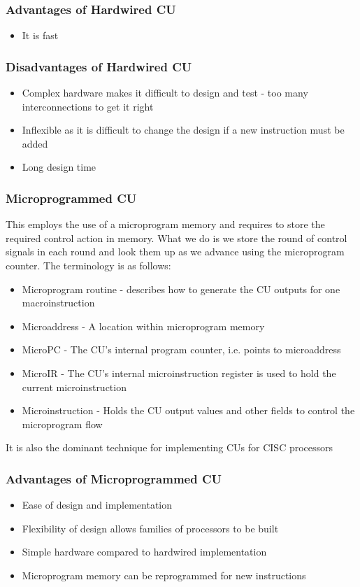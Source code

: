 \documentclass[a4paper]{article}
\theoremstyle{plain}
\theoremstyle{definition}
\theoremstyle{remark}
\begin{document}
\subsubsection{Advantages of Hardwired CU}
\begin{itemize}
	\item It is fast
\end{itemize}
\subsubsection{Disadvantages of Hardwired CU}
\begin{itemize}
	\item Complex hardware makes it difficult to design and test - too many interconnections to get it right
	\item Inflexible as it is difficult to change the design if a new instruction must be added
	\item Long design time
\end{itemize}
\subsubsection{Microprogrammed CU}
This employs the use of a microprogram memory and requires to store the required control action in memory. What we do is we store the round of control signals in each round and look them up as we advance using the microprogram counter. The terminology is as follows:
\begin{itemize}
	\item Microprogram routine - describes how to generate the CU outputs for one macroinstruction 
	\item Microaddress - A location within microprogram memory
	\item MicroPC - The CU's internal program counter, i.e. points to microaddress
	\item MicroIR - The CU's internal microinstruction register is used to hold the current microinstruction
	\item Microinstruction - Holds the CU output values and other fields to control the microprogram flow
\end{itemize}
It is also the dominant technique for implementing CUs for CISC processors
\subsubsection{Advantages of Microprogrammed CU}
\begin{itemize}
	\item Ease of design and implementation
	\item Flexibility of design allows families of processors to be built
	\item Simple hardware compared to hardwired implementation
	\item Microprogram memory can be reprogrammed for new instructions
\end{itemize}
\end{document}

